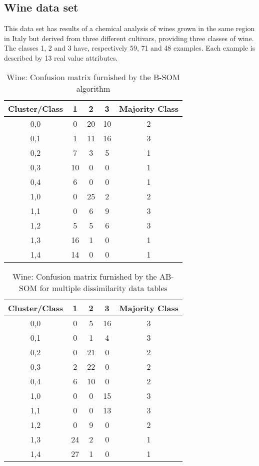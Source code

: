 \documentclass[10pt, conference, compsocconf]{IEEEtran}
\begin{document}
\subsection{Wine data set}

This data set has results of a chemical analysis of wines grown in the same region in Italy but derived from three different cultivars, providing three classes of wine. The classes 1, 2 and 3 have, respectively 59, 71 and 48 examples. Each example is described by 13 real value attributes.

\begin{table}[!h]
\renewcommand{\arraystretch}{1.0}
\begin{center}
\caption{Wine: Confusion matrix furnished by the B-SOM algorithm}
\begin{tabular}{|c|c|c|c||c|}
\hline
Cluster/Class & 1 & 2 & 3 & Majority Class \\ \hline
0,0 & 0 & 20 & 10 & 2 \\ \hline
0,1 & 1 & 11 & 16 & 3\\ \hline
0,2 & 7 & 3 & 5 & 1\\ \hline
0,3 & 10 & 0 & 0 & 1\\ \hline
0,4 & 6 & 0 & 0 & 1\\ \hline \hline
1,0 & 0 & 25 & 2 & 2\\ \hline
1,1 & 0 & 6 & 9 & 3\\ \hline
1,2 & 5 & 5 & 6 & 3\\ \hline
1,3 & 16 & 1 & 0 & 1\\ \hline 
1,4 & 14 & 0 & 0 & 1\\ \hline
\end{tabular}
\label{wine_batch}
\end{center}
\end{table}

\begin{table}[!h]
\renewcommand{\arraystretch}{1.0}
\begin{center}
\caption{Wine: Confusion matrix furnished by the AB-SOM for multiple dissimilarity data tables}
\begin{tabular}{|c|c|c|c||c|}
\hline
Cluster/Class & 1 & 2 & 3 & Majority Class \\ \hline
0,0 & 0 & 5 & 16 & 3 \\ \hline
0,1 & 0 & 1 & 4 & 3\\ \hline
0,2 & 0 & 21 & 0 & 2\\ \hline
0,3 & 2 & 22 & 0 & 2\\ \hline
0,4 & 6 & 10 & 0 & 2\\ \hline \hline
1,0 & 0 & 0 & 15 & 3\\ \hline
1,1 & 0 & 0 & 13 & 3\\ \hline
1,2 & 0 & 9 & 0 & 2\\ \hline
1,3 & 24 & 2 & 0 & 1\\ \hline
1,4 & 27 & 1 & 0 & 1\\ \hline

\end{tabular}
\label{wine_adaptativo}
\end{center}
\end{table}
\end{document}
